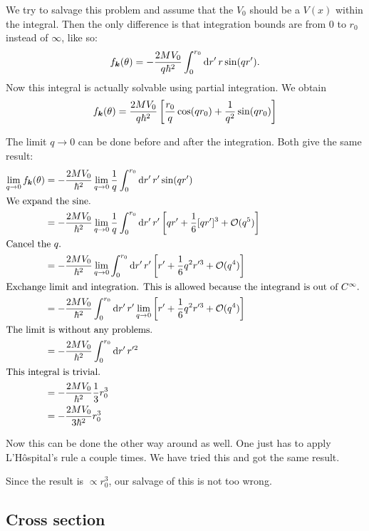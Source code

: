 \documentclass[11pt, english, fleqn, DIV=15, headinclude, BCOR=1.5cm]{scrartcl}
\begin{document}
We try to salvage this problem and assume that the $V_0$ should be a $V(x)$
within the integral. Then the only difference is that integration bounds are
from 0 to $r_0$ instead of $\infty$, like so:
\[
    f_{\boldsymbol{k}}(\theta) = - \frac{2MV_0}{q \hbar^2} \int_0^{r_0} \mathop{}\!\mathrm d r' \, r
    \sin(qr').
\]
Now this integral is actually solvable using partial integration. We obtain
\[
    f_{\boldsymbol{k}}(\theta) = \frac{2MV_0}{q \hbar^2} \left[ 
        \frac{r_0}{q} \cos(qr_0) + \frac{1}{q^2} \sin(qr_0)
     \right]
\]

The limit $q \to 0$ can be done before and after the integration. Both give the
same result:
\begin{align*}
    \lim_{q \to 0} f_{\vec k}(\theta)
    &= - \frac{2MV_0}{\hbar^2} \lim_{q \to 0} \frac{1}{q} \int_0^{r_0} \dif r'
    \, r' \sin(q r') \\
    \intertext{%
        We expand the sine.
    }
    &= - \frac{2MV_0}{\hbar^2} \lim_{q \to 0} \frac{1}{q} \int_0^{r_0} \dif r'
    \, r' \sbr{q r' + \frac{1}{6} [qr']^3 + \mathcal O(q^5)} \\
    \intertext{%
        Cancel the $q$.
    }
    &= - \frac{2MV_0}{\hbar^2} \lim_{q \to 0} \int_0^{r_0} \dif r'
    \, r' \sbr{r' + \frac{1}{6} q^2 r'^3 + \mathcal O(q^4)} \\
    \intertext{%
        Exchange limit and integration. This is allowed because the integrand
        is out of $C^\infty$.
    }
    &= - \frac{2MV_0}{\hbar^2} \int_0^{r_0} \dif r'
    \, r' \lim_{q \to 0} \sbr{r' + \frac{1}{6} q^2 r'^3 + \mathcal O(q^4)} \\
    \intertext{%
        The limit is without any problems.
    }
    &= - \frac{2MV_0}{\hbar^2} \int_0^{r_0} \dif r' \, r'^2 \\
    \intertext{%
        This integral is trivial.
    }
    &= - \frac{2MV_0}{\hbar^2} \frac{1}{3} r_0^3 \\
    &= - \frac{2MV_0}{3\hbar^2} r_0^3
\end{align*}

Now this can be done the other way around as well. One just has to apply
L'Hôspital's rule a couple times. We have tried this and got the same result.

Since the result is $\propto r_0^3$, our salvage of this is not too wrong.

\subsection{Cross section}
\end{document}

